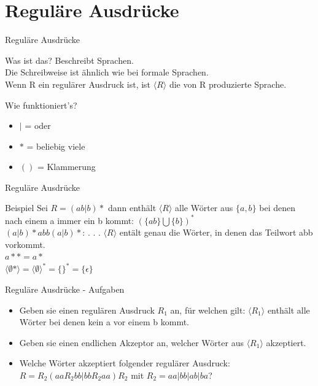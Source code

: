 	
	
	\section{Reguläre Ausdrücke}
	
	\begin{frame}{Reguläre Ausdrücke}
		\begin{block}{Was ist das?}
			\pause
			Beschreibt Sprachen.\\
			Die Schreibweise ist ähnlich wie bei formale Sprachen.\\
			Wenn R ein regulärer Ausdruck ist, ist $\langle R\rangle$ die von R produzierte Sprache.
		\end{block}
			\pause
		
		\begin{block}{Wie funktioniert's?}
			\begin{itemize}
			\pause
				\item $|$ = oder
			\pause
				\item $*$ = beliebig viele
			\pause
				\item $()$ = Klammerung
			\end{itemize}
		\end{block}
	\end{frame}
	
	\begin{frame}{Reguläre Ausdrücke}
		
		\begin{exampleblock}{Beispiel}
			Sei $R = (ab|b)*$ dann enthält $\langle R\rangle$ alle Wörter aus $\{a,b\}$ bei denen nach einem a immer ein b kommt: $(\{ab\}\bigcup \{b\})^*$\\
			\vspace{10pt}
			\pause
			$(a|b)*abb(a|b)*$: . . . $\langle R\rangle$ entält genau die Wörter, in denen das Teilwort abb vorkommt.\\
			\vspace{10pt}
			\pause
			$a*\!* = a*$\\
			\vspace{10pt}
			$\langle \emptyset *\rangle =\langle \emptyset \rangle ^* = \{\}^* = \{\epsilon\} $
		\end{exampleblock}
	\end{frame}
	
	
	\begin{frame}{Reguläre Ausdrücke - Aufgaben}
		\begin{itemize}
			\item Geben sie einen regulären Ausdruck $R_1$ an, für welchen gilt: $\langle R_1\rangle$ enthält alle Wörter bei denen kein a vor einem b kommt.
			\item Geben sie einen endlichen Akzeptor an, welcher Wörter aus $\langle R_1\rangle$ akzeptiert.
			\item Welche Wörter akzeptiert folgender regulärer Ausdruck:\\
				$R = R_2(aaR_2bb|bbR_2aa)R_2$ mit $R_2 = aa|bb|ab|ba$?
		\end{itemize}
	\end{frame}
	
